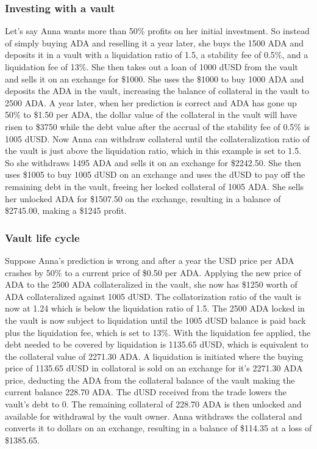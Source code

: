 \documentclass[12pt]{article}
\begin{document}
	\subsubsection{Investing with a vault}

Let's say Anna wants more than 50\% profits on her initial investment. So instead of simply buying ADA and reselling it a year later, she buys the 1500 ADA and deposits it in a vault with a liquidation ratio of 1.5, a stability fee of 0.5\%, and a liquidation fee of 13\%. She then takes out a loan of 1000 dUSD from the vault and sells it on an exchange for \$1000. She uses the \$1000 to buy 1000 ADA and deposits the ADA in the vault, increasing the balance of collateral in the vault to 2500 ADA. A year later, when her prediction is correct and ADA has gone up 50\% to \$1.50 per ADA, the dollar value of the collateral in the vault will have risen to \$3750 while the debt value after the accrual of the stability fee of 0.5\% is 1005 dUSD. Now Anna can withdraw collateral until the collateralization ratio of the vault is just above the liquidation ratio, which in this example is set to 1.5. So she withdraws 1495 ADA and sells it on an exchange for \$2242.50. She then uses \$1005 to buy 1005 dUSD on an exchange and uses the dUSD to pay off the remaining debt in the vault, freeing her locked collateral of 1005 ADA. She sells her unlocked ADA for \$1507.50 on the exchange, resulting in a balance of \$2745.00, making a \$1245 profit.

	\subsubsection{Vault life cycle}

Suppose Anna's prediction is wrong and after a year the USD price per ADA crashes by 50\% to a current price of \$0.50 per ADA. Applying the new price of ADA to the 2500 ADA collateralized in the vault, she now has \$1250 worth of ADA collateralized against 1005 dUSD. The collatorization ratio of the vault is now at 1.24 which is below the liquidation ratio of 1.5. The 2500 ADA locked in the vault is now subject to liquidation until the 1005 dUSD balance is paid back plus the liquidation fee, which is set to 13\%. With the liquidation fee applied, the debt needed to be covered by liquidation is 1135.65 dUSD, which is equivalent to the collateral value of 2271.30 ADA. A liquidation is initiated where the buying price of 1135.65 dUSD in collatoral is sold on an exchange for it's 2271.30 ADA price, deducting the ADA from the collateral balance of the vault making the current balance 228.70 ADA. The dUSD received from the trade lowers the vault's debt to 0. The remaining collateral of 228.70 ADA is then unlocked and available for withdrawal by the vault owner. Anna withdraws the collateral and converts it to dollars on an exchange, resulting in a balance of \$114.35 at a loss of \$1385.65.
\end{document}
